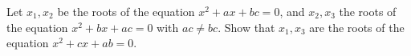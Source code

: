 Let $x_1, x_2$ be the roots of the equation $x^2 + ax + bc = 0$, and $x_2, x_3$ the roots of the equation $x^2 + bx + ac = 0$ with $ac \neq bc$. Show that $x_1, x_3$ are the roots of the equation $x^2 + cx + ab = 0$.
